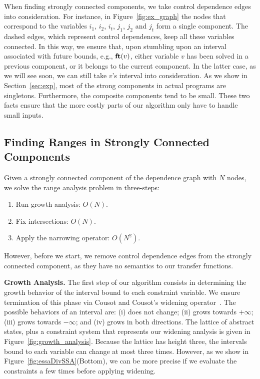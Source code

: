 \documentclass{llncs}
\newcommand{\fun}[1]{\mbox{\textbf{#1}}}
\begin{document}
When finding strongly connected components, we take control dependence
edges into consideration.
For instance, in Figure~\ref{fig:ex_graph} the nodes that correspond to the
variables $i_1$, $i_2$, $i_t$, $j_1$, $j_2$ and $j_t$ form a single component.
The dashed edges, which represent control dependences, keep all these variables
connected.
In this way, we ensure that, upon stumbling upon an interval associated with
future bounds, e.g., $\fun{ft}(v)$, either variable $v$ has been solved in a
previous component, or it belongs to the current component.
In the latter case, as we will see soon, we can still take $v$'s interval into
consideration.
As we show in Section~\ref{sec:exp}, most of the strong components in actual
programs are singletons.
Furthermore, the composite components tend to be small.
These two facts ensure that the more costly parts of our algorithm only have to
handle small inputs.

\subsection{Finding Ranges in Strongly Connected Components}
\label{sub:micro}

Given a strongly connected component of the dependence graph with $N$ nodes,
we solve the range analysis problem in three-steps:
\begin{enumerate}
\item Run growth analysis: $O(N)$.

\item Fix intersections: $O(N)$.

\item Apply the narrowing operator: $O(N^2)$.

\end{enumerate}
However, before we start, we remove control dependence edges from the
strongly connected component, as they have no semantics to our transfer
functions.

\noindent
\textbf{Growth Analysis.}
The first step of our algorithm consists in determining the growth behavior of
the interval bound to each constraint variable.
We ensure termination of this phase via Cousot and Cousot's widening
operator~\cite[p.247]{Cousot77}.
The possible behaviors of an interval are:
(i) does not change;
(ii) grows towards $+\infty$;
(iii) grows towards $-\infty$; and
(iv) grows in both directions.
The lattice of abstract states, plus a constraint system that represents our
widening analysis is given in Figure~\ref{fig:growth_analysis}.
Because the lattice has height three, the intervals bound to each variable can
change at most three times.
However, as we show in Figure~\ref{fig:essaDivSSA}(Bottom), we can be more
precise if we evaluate the constraints a few times before applying widening.
\end{document}

